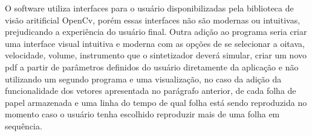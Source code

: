 \documentclass[12pt]{report}
\begin{document}
O software utiliza interfaces para o usuário disponibilizadas pela biblioteca de visão aritificial OpenCv, porém essas interfaces não são modernas ou intuitivas, prejudicando a experiência do usuário final. Outra adição ao programa seria criar uma interface visual intuitiva e moderna com as opções de se selecionar a oitava, velocidade, volume, instrumento que o sintetizador deverá simular, criar um novo pdf a partir de parâmetros definidos do usuário diretamente da aplicação e não utilizando um segundo programa e uma visualização, no caso da adição da funcionalidade dos vetores apresentada no parágrafo anterior, de cada folha de papel armazenada e uma linha do tempo de qual folha está sendo reproduzida no momento caso o usuário tenha escolhido reproduzir mais de uma folha em sequência.


\end{document}
